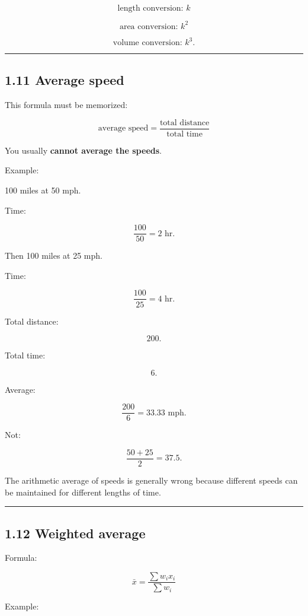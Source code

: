 \documentclass[
]{article}
\begin{document}
\[
\boxed{\text{length conversion: }k}
\]

\[
\boxed{\text{area conversion: }k^2}
\]

\[
\boxed{\text{volume conversion: }k^3}.
\]

\begin{center}\rule{0.5\linewidth}{0.5pt}\end{center}

\subsection{1.11 Average speed}\label{average-speed}

This formula must be memorized:

\[
\boxed{
\text{average speed}
=
\frac{\text{total distance}}
{\text{total time}}
}
\]

You usually \textbf{cannot average the speeds}.

Example:

100 miles at 50 mph.

Time:

\[
\frac{100}{50}=2\text{ hr}.
\]

Then 100 miles at 25 mph.

Time:

\[
\frac{100}{25}=4\text{ hr}.
\]

Total distance:

\[
200.
\]

Total time:

\[
6.
\]

Average:

\[
\frac{200}{6}
=
33.33\text{ mph}.
\]

Not:

\[
\frac{50+25}{2}=37.5.
\]

The arithmetic average of speeds is generally wrong because different
speeds can be maintained for different lengths of time.

\begin{center}\rule{0.5\linewidth}{0.5pt}\end{center}

\subsection{1.12 Weighted average}\label{weighted-average}

Formula:

\[
\boxed{
\bar x=
\frac{\sum w_ix_i}{\sum w_i}
}
\]

Example:
\end{document}
